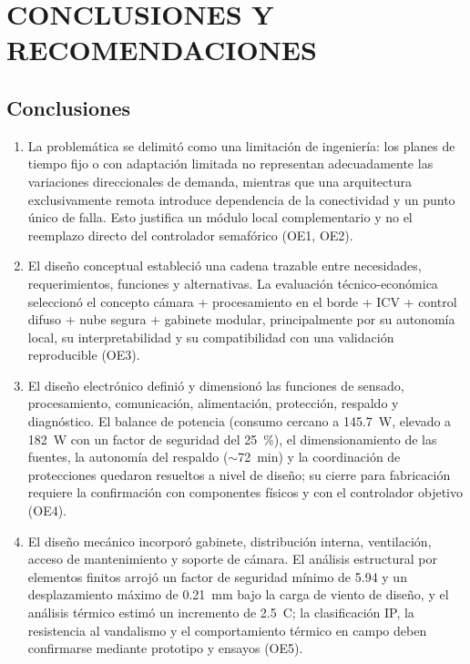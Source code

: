 \chapter*{CONCLUSIONES Y RECOMENDACIONES}
\label{cap:conclusiones}

\section*{Conclusiones}

\begin{enumerate}
\item La problemática se delimitó como una limitación de ingeniería: los planes de tiempo fijo o con
adaptación limitada no representan adecuadamente las variaciones direccionales de demanda, mientras que una
arquitectura exclusivamente remota introduce dependencia de la conectividad y un punto único de falla. Esto
justifica un módulo local complementario y no el reemplazo directo del controlador semafórico (OE1, OE2).

\item El diseño conceptual estableció una cadena trazable entre necesidades, requerimientos, funciones y
alternativas. La evaluación técnico-económica seleccionó el concepto cámara + procesamiento en el borde +
ICV + control difuso + nube segura + gabinete modular, principalmente por su autonomía local, su
interpretabilidad y su compatibilidad con una validación reproducible (OE3).

\item El diseño electrónico definió y dimensionó las funciones de sensado, procesamiento, comunicación,
alimentación, protección, respaldo y diagnóstico. El balance de potencia (consumo cercano a 145.7~W,
elevado a 182~W con un factor de seguridad del 25~\%), el dimensionamiento de las fuentes, la autonomía del
respaldo ($\sim$72~min) y la coordinación de protecciones quedaron resueltos a nivel de diseño; su cierre
para fabricación requiere la confirmación con componentes físicos y con el controlador objetivo (OE4).

\item El diseño mecánico incorporó gabinete, distribución interna, ventilación, acceso de mantenimiento y
soporte de cámara. El análisis estructural por elementos finitos arrojó un factor de seguridad mínimo de
5.94 y un desplazamiento máximo de 0.21~mm bajo la carga de viento de diseño, y el análisis térmico estimó
un incremento de 2.5~\textdegree C; la clasificación IP, la resistencia al vandalismo y el comportamiento
térmico en campo deben confirmarse mediante prototipo y ensayos (OE5).


\end{enumerate}
